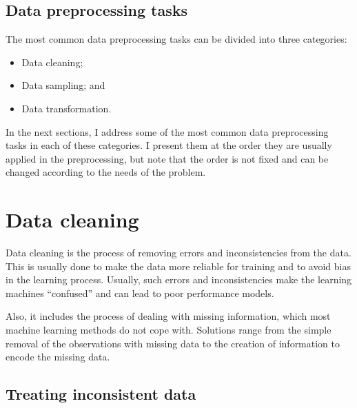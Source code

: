 \subsection{Data preprocessing tasks}

The most common data preprocessing tasks can be divided into three categories:
\begin{itemize}
  \itemsep0em
  \item Data cleaning;
  \item Data sampling; and
  \item Data transformation. %
\end{itemize}

In the next sections, I address some of the most common data preprocessing tasks
in each of these categories.  I present them at the order they are usually applied in the
preprocessing, but note that the order is not fixed and can be changed according to the
needs of the problem.

\section{Data cleaning}

Data cleaning is the process of removing errors and inconsistencies from the data.  This is
usually done to make the data more reliable for training and to avoid bias in the learning
process.  Usually, such errors and inconsistencies make the learning machines ``confused''
and can lead to poor performance models.

Also, it includes the process of dealing with missing information, which most machine
learning methods do not cope with.  Solutions range from the simple removal of the
observations with missing data to the creation of information to encode the missing data.

\subsection{Treating inconsistent data}


